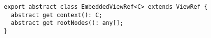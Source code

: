 \begin{verbatim}
export abstract class EmbeddedViewRef<C> extends ViewRef {
  abstract get context(): C;
  abstract get rootNodes(): any[];
}
\end{verbatim}
